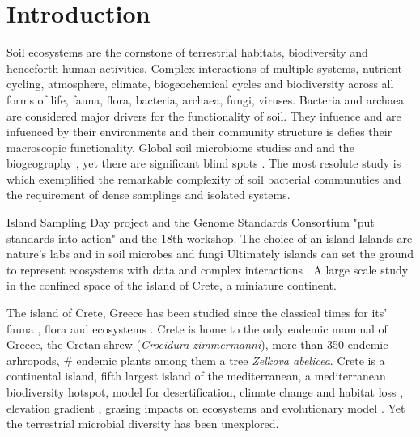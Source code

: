 \documentclass[unnumsec,webpdf,contemporary,large]{oup-authoring-template}%
\theoremstyle{thmstyleone}%
\theoremstyle{thmstyletwo}%
\theoremstyle{thmstylethree}%
\begin{document}


\maketitle


\section{Introduction}\label{intro}

Soil ecosystems are the cornstone of terrestrial habitats, biodiversity and henceforth human activities.
Complex interactions of multiple systems, nutrient cycling, atmosphere, climate, biogeochemical cycles and biodiversity 
across all forms of life, fauna, flora, bacteria, archaea, fungi, viruses. 
Bacteria and archaea are considered major drivers for the functionality of soil.
They infuence and are infuenced by their environments and their community structure 
is defies their macroscopic functionality.
Global soil microbiome studies \citep{Delgado-Baquerizo2018} and \citep{Bahram2018} and the biogeography \citep{Martiny2006} \citep{Guerra2020}, \citep{Labouyrie2023} yet there are significant blind spots \citep{Guerra2020}. The most resolute study is \citep{Karimi2020} which exemplified the 
remarkable complexity of soil bacterial communuties and the requirement of dense samplings and isolated systems. 

Island Sampling Day project and the 
Genome Standards Consortium \citep{Field2011} "put standards into action" and the 
18th workshop. 
The choice of an island
Islands are nature's labs \citep{Whittaker2017} and in soil microbes \citep{Li2020} and fungi \citep{Delavaux2021}
Ultimately islands can set the ground to represent ecosystems with data and complex interactions \citep{Davies2016}.
A large scale study in the confined space of the island of Crete, a miniature continent.


The island of Crete, Greece has been studied since the classical times for its' fauna \citep{Sidiropoulos_Polymeni_Legakis_2017,Anastasiou2018Tenebrionid}, flora \citep{Krimbas_2005} and ecosystems \citep{Grove1993}.
Crete is home to the only endemic mammal of Greece, the Cretan shrew (\textit{Crocidura zimmermanni}), more than 350 endemic arhropods, \# endemic plants among them a tree \textit{Zelkova abelicea}.
Crete is a continental island, fifth largest island of the mediterranean, a mediterranean biodiversity hotspot, model for desertification, climate change \citep{Kougioumoutzis2020} and habitat loss \citep{ISPIKOUDIS1993259},
elevation gradient \citep{trigas2013, FAZAN2017}, grasing impacts on ecosystems \citep{JouffroyBapicot2016} and evolutionary model \citep{POULAKAKIS2002}.
Yet the terrestrial microbial diversity has been unexplored.
\end{document}
